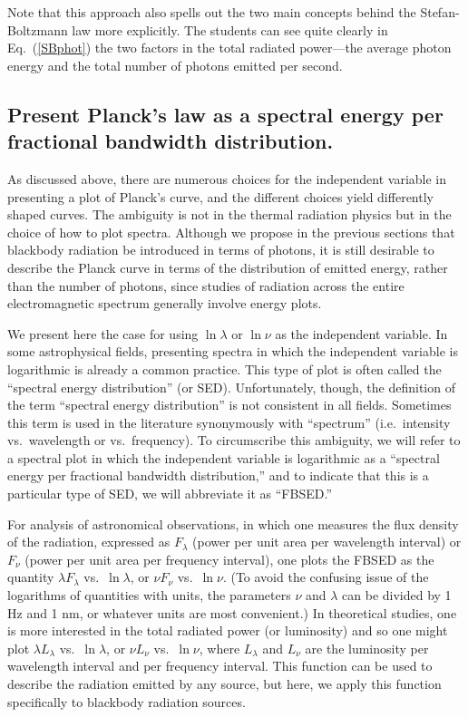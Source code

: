 \documentclass[12pt,aps,prb,preprint]{revtex4}   %
\begin{document}
Note that this approach also spells out the two main concepts behind the Stefan-Boltzmann law more explicitly.  The students can see quite clearly in 
Eq.~(\ref{SBphot}) the two factors in the total radiated power---the average photon energy and the total number of photons emitted per second.

\subsection{Present Planck's law as a spectral energy per fractional bandwidth distribution.}

As discussed above, there are numerous choices for the independent variable in presenting a plot of Planck's curve, and the different choices yield differently shaped curves.\cite{Chiu,SL,Heald,Stewart}  The ambiguity is not in the thermal radiation physics but in the choice of how to plot spectra.
Although we propose in the previous sections that blackbody radiation be introduced in terms of photons, it is still desirable to describe the Planck curve in terms of the distribution of emitted energy, rather than the number of photons, since studies of radiation across the entire electromagnetic spectrum generally involve energy plots.

We present here the case for using $\ln\lambda$ or $\ln\nu$ as the independent variable.  In some astrophysical fields, presenting spectra in which the independent variable is logarithmic is already a common practice.\cite{ALS,Elv} This type of plot is often called the ``spectral energy distribution'' (or SED).\cite{CO}  Unfortunately, though, the definition of the term ``spectral energy distribution'' is not consistent in all fields.  Sometimes this term is used in the literature synonymously with ``spectrum'' (i.e.\ intensity vs.\ wavelength or vs.\ frequency).\cite{SED}  To circumscribe this ambiguity, we will refer to a spectral plot in which the independent variable is logarithmic as a ``spectral energy per fractional bandwidth distribution,'' and to indicate that this is a particular type of SED, we will abbreviate it as ``FBSED.''

For analysis of astronomical observations, in which one measures the flux density of the radiation, expressed as $F_\lambda$ (power per unit area per wavelength interval) or $F_\nu$  (power per unit area per frequency interval), one plots the FBSED as the quantity 
$\lambda F_\lambda$ vs.\ $\ln\lambda$, or $\nu F_\nu$ vs.\ $\ln\nu$.  (To avoid the confusing issue of the logarithms of quantities with units, the parameters $\nu$ and $\lambda$ can be divided by 1 Hz and 1 nm, or whatever units are most convenient.)  In theoretical studies, one is more interested in the total radiated power (or luminosity) and so  
one might plot 
$\lambda L_\lambda$ vs.\ $\ln\lambda$, or $\nu L_\nu$ vs.\ $\ln\nu$, where $L_\lambda$ and $L_\nu$ are the luminosity per wavelength interval and per frequency interval.  This function can be used to describe the radiation emitted by any source, but here, we apply this function specifically to blackbody radiation sources. 
\end{document}
